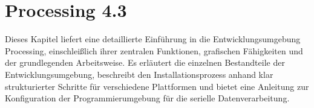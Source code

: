 %
%
%


\chapter{Processing 4.3}\label{chap:Processing_IDE_Installation}
Dieses Kapitel liefert eine detaillierte Einführung in die Entwicklungsumgebung Processing, einschlei\ss lich ihrer zentralen Funktionen, grafischen Fähigkeiten und der grundlegenden Arbeitsweise. Es erläutert die einzelnen Bestandteile der Entwicklungsumgebung, beschreibt den Installationsprozess anhand klar strukturierter Schritte für verschiedene Plattformen und bietet eine Anleitung zur Konfiguration der Programmierumgebung für die serielle Datenverarbeitung.

